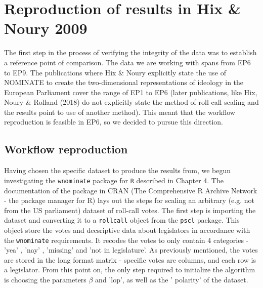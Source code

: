 \documentclass[a4paper,12pt]{report}
\begin{document}
        \section{Reproduction of results in Hix \& Noury 2009}\label{sec:reproduction-of-results-in-hix-&-noury-2009}
            The first step in the process of verifying the integrity of the data was to establish a reference point of
            comparison. The data we are working with spans from EP6 to EP9. The publications where Hix & Noury
            explicitly state the use of NOMINATE to create the two-dimensional representations of ideology in the
            European Parliament cover the range of EP1 to EP6 (later publications, like Hix, Noury \& Rolland (2018) do
            not
            explicitly state the method of roll-call scaling and the results point to use of another method). This meant
            that the workflow reproduction is feasible in EP6, so we decided to pursue this direction.

            \subsection{Workflow reproduction}\label{subsec:workflow-reproduction}
                Having chosen the specific dataset to produce the results from, we begun investigating the
                \texttt{wnominate}
                package for \texttt{R}
                described in Chapter 4. The documentation of the package in CRAN (The Comprehensive R
                Archive Network - the package manager for R) lays out the steps for scaling an arbitrary (e.g.
                not from the US
                parliament) dataset of roll-call votes. The first step is importing the dataset and converting
                it to a
                \texttt{rollcall} object from the \texttt{pscl}
                package. This object store the votes and decsriptive data about
                legislators in accordance with the \texttt{wnominate}
                requirements. It recodes the votes to only contain 4
                categories - 'yea' , 'nay' , 'missing' and 'not in legislature'. As previously mentioned, the
                votes are stored
                in the long format matrix - specific votes are columns, and each row is a legislator. From this
                point on, the
                only step required to initialize the algorithm is choosing the parameters \( \beta \)
                and 'lop', as well as the '
                polarity' of the dataset.
\end{document}
